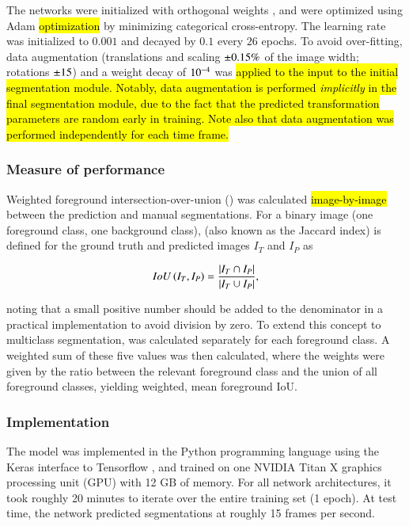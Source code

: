 The networks were initialized with orthogonal weights \hl{\citep{Saxe2013}}, and were optimized using Adam \hl{optimization} \citep{Kingma2015} by minimizing categorical cross-entropy.
The learning rate was initialized to $0.001$ and decayed by $0.1$ every $26$ epochs.
To avoid over-fitting, data augmentation (translations and scaling $\pm 0.15{}\%$ of the image width; rotations $\pm \AugRot{}$\degree) and a weight decay of $10^{-4}{}$ was \hl{applied to the input to the initial segmentation module.
Notably, data augmentation is performed \emph{implicitly} in the final segmentation module, due to the fact that the predicted transformation parameters are random early in training.
Note also that data augmentation was performed independently for each time frame.
}

\subsubsection{Measure of performance}

Weighted foreground intersection-over-union (\IoU{}) was calculated \hl{image-by-image} between the prediction and manual segmentations.
For a binary image (one foreground class, one background class), \IoU{} (also known as the Jaccard index) is defined for the ground truth and predicted images $I_T$ and $I_P$ as

\begin{equation}
IoU{} \left( I_T, I_P \right) = \frac{|I_T \cap I_P|}{|I_T \cup I_P|},
\end{equation}

\noindent noting that a small positive number should be added to the denominator in a practical implementation to avoid division by zero.
To extend this concept to multiclass segmentation, \IoU{} was calculated separately for each foreground class.
A weighted sum of these five \IoU{} values was then calculated, where the weights were given by the ratio between the relevant foreground class and the union of all foreground classes, yielding weighted, mean foreground IoU{}.

\subsubsection{Implementation}

The model was implemented in the Python programming language using the Keras interface to Tensorflow \hl{\citep{Chollet2015,Abadi2016}}, and trained on one NVIDIA Titan X graphics processing unit (GPU) with 12 GB of memory.
For all network architectures, it took roughly 20 minutes to iterate over the entire training set (1 epoch).
At test time, the network predicted segmentations at roughly 15 frames per second.

